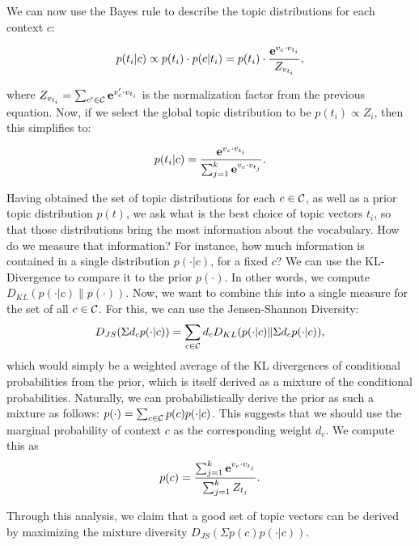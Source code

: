 We can now use the Bayes rule to describe the topic distributions for
each context $c$:

\[p(t_i|c)\propto p(t_i)\cdot p(c|t_i) = p(t_i)\cdot
\frac{\operatorname{\mathbf{e}}^{v_c\cdot v_{t_i}}}{Z_{v_{t_i}}},\]

where $Z_{v_{t_i}}=\sum_{c'\in{\mathcal C}}\operatorname{\mathbf{e}}^{v_c'\cdot v_{t_i}}$ is the normalization factor
from the previous equation. Now, if we select the global topic
distribution to be $p(t_i)\propto Z_i$, then this simplifies to:

\[p(t_i|c)=\frac{\operatorname{\mathbf{e}}^{v_c\cdot v_{t_i}}}{\sum_{j=1}^k\operatorname{\mathbf{e}}^{v_c\cdot
    v_{t_j}}}.\]

Having obtained the set of topic distributions for each $c\in{\mathcal C}$, as
well as a prior topic distribution $p(t)$, we ask what is the best
choice of topic vectors $t_i$, so that those distributions bring the
most information about the vocabulary. How do we measure that
information? For instance, how much information is contained in a
single distribution $p(\cdot|c)$, for a fixed $c$? We
can use the KL-Divergence to compare it to the prior $p(\cdot)$. In
other words, we compute $D_{KL}(p(\cdot|c)\|p(\cdot))$. Now, we want to
combine this into a single measure for the set of all $c\in{\mathcal C}$. For
this, we can use the Jensen-Shannon Diversity:
\[D_{JS}(\Sigma d_c p(\cdot|c)) = \sum_{c\in{\mathcal C}}d_c D_{KL}(p(\cdot|c)\|\Sigma d_c p(\cdot|c)),\]
which would simply be a weighted average of the KL divergences of
conditional probabilities from the prior, which is itself derived as a
mixture of the conditional probabilities. Naturally, we can
probabilistically derive the prior as such a mixture as follows:
$p(\cdot)=\sum_{c\in{\mathcal C}}p(c) p(\cdot|c)$.
This suggests that we should use the marginal probability of context
$c$ as the corresponding weight $d_c$. We compute this as
\[p(c)=\frac{\sum_{j=1}^k\operatorname{\mathbf{e}}^{v_c\cdot v_{t_j}}}{\sum_{j=1}^k Z_{t_j}}.\]

Through this analysis, we claim that a good set of topic vectors can
be derived by maximizing the mixture diversity $D_{JS}(\Sigma
p(c)p(\cdot|c))$. 



